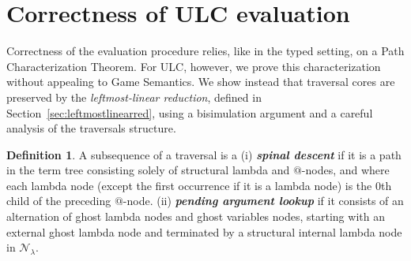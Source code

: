 \documentclass[xchauthor,chkrefs,GCNS,amsmath,amsthm,rotating,leaveRGB]{tcsg}
\renewcommand{\index}[1]{}
\theoremstyle{plain}
\theoremstyle{definition}
\newtheorem{definition}{Definition}[section]
\newcommand{\Nodes}{\mathcal{N}}
\newcommand{\NodesLmd}{\Nodes_\lambda}
\newcommand{\llred}{\rightarrow_{ll}}
\begin{document}
%
%
%
%




\section{Correctness of ULC evaluation}\label{sec:correctness_ulc_normalization}

Correctness of the evaluation procedure relies, like in the typed setting, on
a Path Characterization Theorem. For ULC, however, we prove this
characterization without appealing to Game Semantics. We show instead that
traversal cores are preserved by the \emph{leftmost-linear reduction},
defined in Section~\ref{sec:leftmostlinearred}, using a bisimulation argument
and a careful analysis of the traversals structure.

\begin{definition}\label{def:spinaldescent_pendingarglookup}
A subsequence of a traversal is a (i) {\textbf{\emph{spinal
descent}}}\index{spinal descent} if it is a path in the term tree consisting
solely of structural lambda and $@$-nodes, and where each lambda node (except
the first occurrence if it is a lambda node) is the $0$th child of the
preceding $@$-node. (ii) {\textbf{\emph{pending argument
lookup}}}\index{pending argument lookup} if it consists of an alternation of
ghost lambda nodes and ghost variables nodes, starting with an external ghost
lambda node and terminated by a structural internal lambda node in
$\NodesLmd$.
\end{definition}
\end{document}
